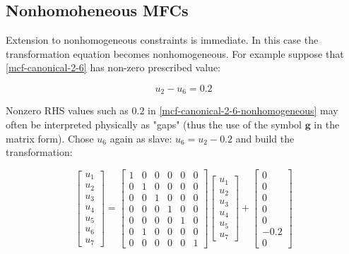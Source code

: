 \documentclass[10pt,b5paper,titlepage]{book}
\newcommand{\m}{\mathbf}
\begin{document}
\subsection{Nonhomoheneous MFCs}

Extension to nonhomogeneous constraints is immediate. In this case the transformation
equation becomes nonhomogeneous. For example suppose that \eqref{mcf-canonical-2-6}
has non-zero prescribed value:

\begin{equation}\label{mcf-canonical-2-6-nonhomogeneous}
    u_2 - u_6 = 0.2
\end{equation}

Nonzero RHS values such as $ 0.2 $ in \eqref{mcf-canonical-2-6-nonhomogeneous}
may often be interpreted physically as "gaps" (thus the use of the symbol
$ \m{g} $ in the matrix form). Chose $ u_6 $ again as slave: $ u_6 = u_2 - 0.2 $
and build the transformation:

\begin{equation}
    \begin{bmatrix}
        u_1 \\
        u_2 \\
        u_3 \\
        u_4 \\
        u_5 \\
        u_6 \\
        u_7
    \end{bmatrix}
    = \begin{bmatrix}
        1 & 0 & 0 & 0 & 0 & 0 \\
        0 & 1 & 0 & 0 & 0 & 0 \\
        0 & 0 & 1 & 0 & 0 & 0 \\
        0 & 0 & 0 & 1 & 0 & 0 \\
        0 & 0 & 0 & 0 & 1 & 0 \\
        0 & 1 & 0 & 0 & 0 & 0 \\
        0 & 0 & 0 & 0 & 0 & 1
    \end{bmatrix}
    \begin{bmatrix}
        u_1 \\
        u_2 \\
        u_3 \\
        u_4 \\
        u_5 \\
        u_7
    \end{bmatrix} +
    \begin{bmatrix}
        0 \\
        0 \\
        0 \\
        0 \\
        0 \\
        -0.2 \\
        0
    \end{bmatrix}
\end{equation}
\end{document}
